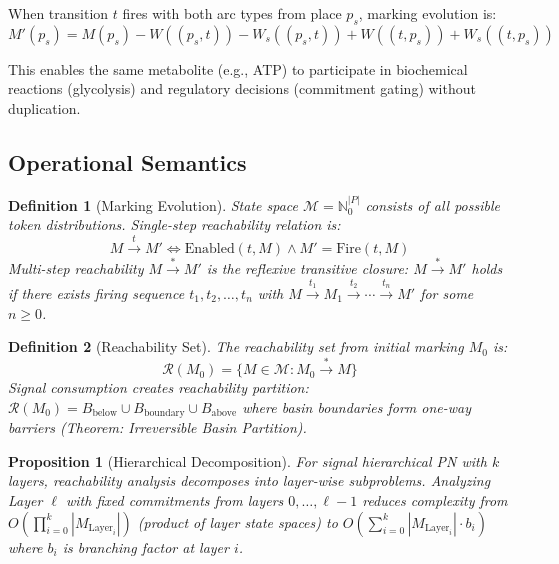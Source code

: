 \documentclass[10pt,letterpaper]{article}
\newtheorem{definition}{Definition}
\newtheorem{proposition}{Proposition}
\begin{document}
When transition $t$ fires with both arc types from place $p_s$, marking evolution is:
\begin{equation}
M'(p_s) = M(p_s) - W((p_s,t)) - W_s((p_s,t)) + W((t,p_s)) + W_s((t,p_s))
\end{equation}

This enables the same metabolite (e.g., ATP) to participate in biochemical reactions (glycolysis) and regulatory decisions (commitment gating) without duplication.

\subsection{Operational Semantics}

\begin{definition}[Marking Evolution]
State space $\mathcal{M} = \mathbb{N}_0^{|P|}$ consists of all possible token distributions. Single-step reachability relation is:
\begin{equation}
M \xrightarrow{t} M' \iff \text{Enabled}(t, M) \wedge M' = \text{Fire}(t, M)
\end{equation}
Multi-step reachability $M \xrightarrow{*} M'$ is the reflexive transitive closure: $M \xrightarrow{*} M'$ holds if there exists firing sequence $t_1, t_2, \ldots, t_n$ with $M \xrightarrow{t_1} M_1 \xrightarrow{t_2} \cdots \xrightarrow{t_n} M'$ for some $n \geq 0$.
\end{definition}

\begin{definition}[Reachability Set]
The reachability set from initial marking $M_0$ is:
\begin{equation}
\mathcal{R}(M_0) = \{M \in \mathcal{M} : M_0 \xrightarrow{*} M\}
\end{equation}
Signal consumption creates reachability partition: $\mathcal{R}(M_0) = B_{\text{below}} \cup B_{\text{boundary}} \cup B_{\text{above}}$ where basin boundaries form one-way barriers (Theorem: Irreversible Basin Partition).
\end{definition}

\begin{proposition}[Hierarchical Decomposition]
For signal hierarchical PN with $k$ layers, reachability analysis decomposes into layer-wise subproblems. Analyzing Layer $\ell$ with fixed commitments from layers $0, \ldots, \ell-1$ reduces complexity from $O(\prod_{i=0}^{k} |M_{\text{Layer}_i}|)$ (product of layer state spaces) to $O(\sum_{i=0}^{k} |M_{\text{Layer}_i}| \cdot b_i)$ where $b_i$ is branching factor at layer $i$.
\end{proposition}
\end{document}
